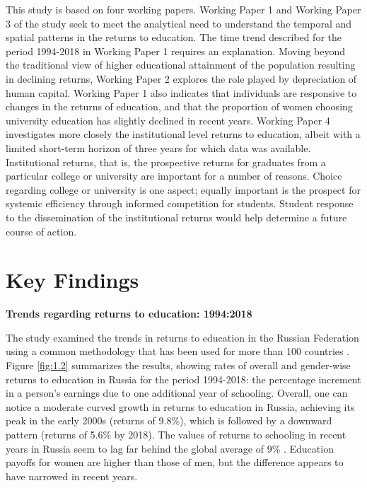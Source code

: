\documentclass[alpha-refs]{wiley-article-04t}
\begin{document}
This study is based on four working papers. Working Paper 1 and 
Working Paper 3 of the study seek to meet the analytical need to understand 
the temporal and spatial patterns in the returns to education. The time 
trend described for the period 1994-2018 in Working Paper 1 requires an 
explanation. Moving beyond the traditional view of higher 
educational attainment of the population resulting in declining returns, 
Working Paper 2 explores the role played by depreciation of human capital. 
Working Paper 1 also indicates that individuals are responsive to changes 
in the returns of education, and that the proportion of women choosing 
university education has slightly declined in recent years. Working Paper 4 
investigates more closely the institutional level returns to education, 
albeit with a limited short-term horizon of three years for which data was 
available. Institutional returns, that is, the prospective returns for 
graduates from a particular college or university are important for a 
number of reasons. Choice regarding college or university is one aspect; 
equally important is the prospect for systemic efficiency through informed 
competition for students. Student response to the dissemination of the 
institutional returns would help determine a future course of action. 

\section{Key Findings}


\textbf{Trends regarding returns to education: 1994:2018}

\vspace{1em}

The study examined the trends in returns to education in the Russian 
Federation using a common methodology that has been used for more than 100 
countries \parencite{Montenegro_Patrinos2014,Psacharopoulos_Patrinos2018}. 
Figure \ref{fig:1.2} summarizes the results, showing rates of overall and 
gender-wise returns to education in Russia for the period 1994-2018: the 
percentage increment in a person's earnings due to one additional year of 
schooling. Overall, one can notice a moderate curved growth in returns to 
education in Russia, achieving its peak in the early 2000s (returns of 
9.8\%), which is followed by a downward pattern (returns of 5.6\% by 2018). 
The values of returns to schooling in recent years in Russia seem to lag 
far behind the global average of 9\% 
\parencite{Psacharopoulos_Patrinos2018}. Education payoffs for women are 
higher than those of men, but the difference appears to have narrowed in 
recent years.\\  
\end{document}
